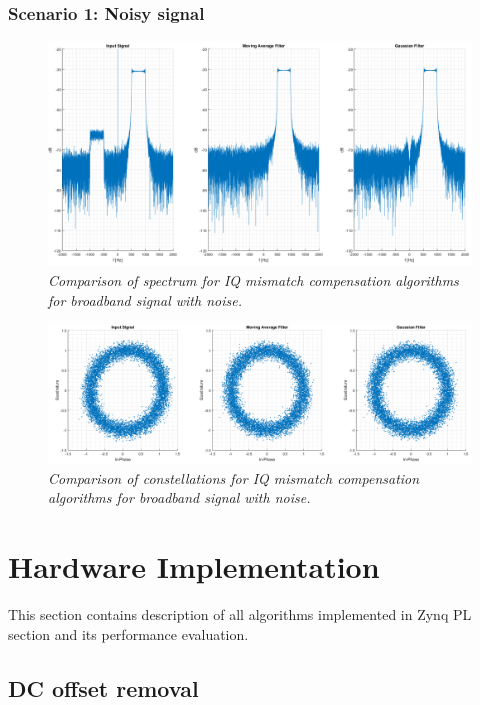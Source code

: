 \documentclass[en,printmode]{mgr}
\begin{document}
		\subsubsection*{Scenario 1: Noisy signal}
			\begin{figure}[!htb]
    			\centering
   				\includegraphics[width=\textwidth]{plots/band_nf.png}
   		 		\caption{\textit{Comparison of spectrum for IQ mismatch compensation algorithms for
   		 		broadband signal with noise.}}
   		 	\end{figure}	
   		 	\begin{figure}[!htb]
    			\centering
   				\includegraphics[width=\textwidth]{plots/band_nc.png}
   		 		\caption{\textit{Comparison of constellations for IQ mismatch compensation algorithms 
   		 		for broadband signal with noise.}}
   		 	\end{figure}
   	\newpage	
	\section{Hardware Implementation}
		This section contains description of all algorithms implemented in Zynq PL section and its 
		performance evaluation.
	 \subsection*{DC offset removal}
	 
\end{document}
